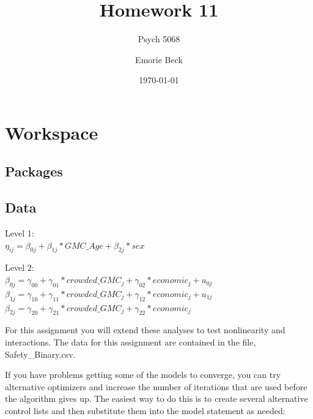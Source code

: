 \documentclass[]{article}
\title{Homework 11}
\subtitle{Psych 5068}
\author{Emorie Beck}
\date{\today}
\newenvironment{Shaded}{\begin{snugshade}}{\end{snugshade}}
\newcommand{\KeywordTok}[1]{\textcolor[rgb]{0.13,0.29,0.53}{\textbf{#1}}}
\newcommand{\StringTok}[1]{\textcolor[rgb]{0.31,0.60,0.02}{#1}}
\newcommand{\OperatorTok}[1]{\textcolor[rgb]{0.81,0.36,0.00}{\textbf{#1}}}
\newcommand{\NormalTok}[1]{#1}
\begin{document}
\maketitle

{
\setcounter{tocdepth}{2}
\tableofcontents
}
\section{Workspace}\label{workspace}

\subsection{Packages}\label{packages}

\subsection{Data}\label{data}

\begin{Shaded}
\end{Shaded}

Level 1:\\
\(\eta_{ij} = \beta_{0j} + \beta_{1j}*GMC\_Age + \beta_{2j}*sex\)

Level 2:\\
\(\beta_{0j} = \gamma_{00} + \gamma_{01}*crowded\_GMC_j + \gamma_{02}*economic_j + u_{0j}\)\\
\(\beta_{1j} = \gamma_{10} + \gamma_{11}*crowded\_GMC_j + \gamma_{12}*economic_j + u_{1j}\)\\
\(\beta_{2j} = \gamma_{20} + \gamma_{21}*crowded\_GMC_j + \gamma_{22}*economic_j\)

For this assignment you will extend these analyses to test nonlinearity
and interactions. The data for this assignment are contained in the
file, Safety\_Binary.csv.

If you have problems getting some of the models to converge, you can try
alternative optimizers and increase the number of iterations that are
used before the algorithm gives up. The easiest way to do this is to
create several alternative control lists and then substitute them into
the model statement as needed:
\end{document}
